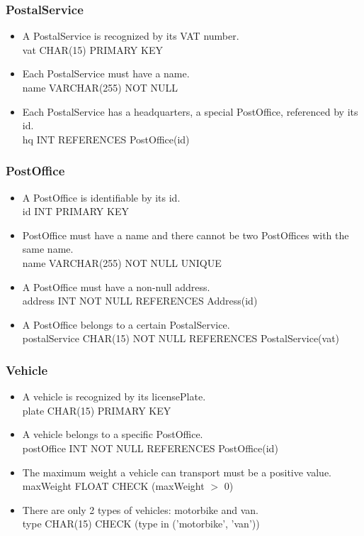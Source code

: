 \documentclass{report}[a4paper]
\theoremstyle{remark}
\begin{document}
\subsubsection{PostalService}
\begin{itemize}
    \item A PostalService is recognized by its VAT number. \\ vat CHAR(15) PRIMARY KEY
    \item Each PostalService must have a name. \\ name VARCHAR(255) NOT NULL
    \item Each PostalService has a headquarters, a special PostOffice, referenced by its id. \\ hq INT REFERENCES PostOffice(id)
\end{itemize}
\subsubsection{PostOffice}
\begin{itemize}
    \item A PostOffice is identifiable by its id. \\ id INT PRIMARY KEY
    \item PostOffice must have a name and there cannot be two PostOffices with the same name. \\ name VARCHAR(255) NOT NULL UNIQUE
    \item A PostOffice must have a non-null address. \\ address INT NOT NULL REFERENCES Address(id)
    \item A PostOffice belongs to a certain PostalService. \\ postalService CHAR(15) NOT NULL REFERENCES PostalService(vat)
\end{itemize}
\subsubsection{Vehicle}
\begin{itemize}
    \item A vehicle is recognized by its licensePlate. \\ plate CHAR(15) PRIMARY KEY
    \item A vehicle belongs to a specific PostOffice. \\ postOffice INT NOT NULL REFERENCES PostOffice(id)
    \item The maximum weight a vehicle can transport must be a positive value. \\ maxWeight FLOAT CHECK (maxWeight $>$ 0)
    \item There are only 2 types of vehicles: motorbike and van. \\ type CHAR(15) CHECK (type in ('motorbike', 'van'))
\end{itemize}
\end{document}
